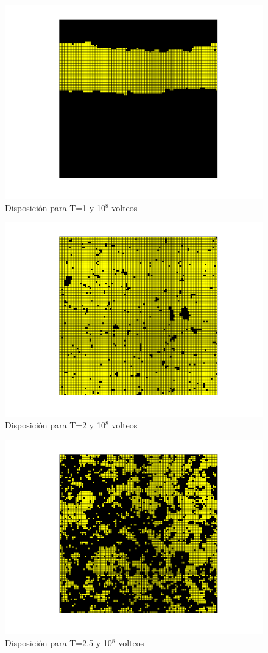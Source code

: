 \documentclass[a4paper,12pt,spanish]{article}
\begin{document}
	\begin{figure}[H]
		\centering
		\includegraphics[width=0.7\linewidth]{../obtencion_resultados/b}
		\caption{Disposición para T=1 y 10$^8$ volteos}
		\label{fig:b}
	\end{figure}


	\begin{figure}[H]
		\centering
		\includegraphics[width=0.7\linewidth]{../obtencion_resultados/c}
		\caption{Disposición para T=2 y 10$^8$ volteos}
		\label{fig:c}
	\end{figure}


	\begin{figure}[H]
		\centering
		\includegraphics[width=0.7\linewidth]{../obtencion_resultados/d}
		\caption{Disposición para T=2.5 y 10$^8$ volteos}
		\label{fig:d}
	\end{figure}
	
\end{document}
